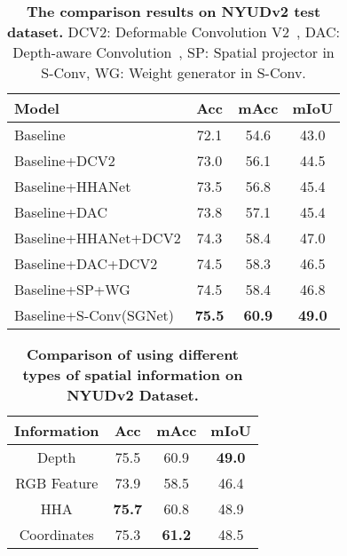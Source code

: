 \documentclass[journal]{IEEEtran}
\begin{document}
\begin{table}[htbp]\normalsize
	\centering
	\renewcommand\tabcolsep{8.0pt}
	\caption{\textbf{The comparison results on NYUDv2 test dataset.}
	    DCV2: Deformable
		Convolution V2~\cite{deformablev2},
		DAC: Depth-aware Convolution~\cite{dcnn}, 
		SP: Spatial projector in S-Conv, WG: Weight generator in S-Conv.
	}
	\label{tab:promote} \vspace{-7pt}
	\begin{tabular}{l ||c c c}
		\toprule[1.5pt]
		Model						&Acc & mAcc & mIoU	 \\
		\hline
		\hline
		Baseline 			       &72.1  &54.6 &43.0\\
		Baseline+DCV2              &73.0 &56.1&44.5\\
		Baseline+HHANet            &73.5  &56.8  &45.4 \\
		Baseline+DAC               &73.8  & 57.1 &45.4 \\
		Baseline+HHANet+DCV2 &74.3  &58.4  &47.0   \\
		Baseline+DAC+DCV2    &74.5  &58.3  &46.5   \\
		Baseline+SP+WG             &74.5  & 58.4 &46.8 \\
		Baseline+S-Conv(SGNet)     &\textbf{75.5}  &\textbf{60.9} &\textbf{49.0}\\
		\bottomrule[1.5pt]
	\end{tabular}
\end{table}



\begin{table}[t]\normalsize
	\centering
	\renewcommand\tabcolsep{14pt}
	\caption{\textbf{Comparison of using different types of spatial 
	information on NYUDv2 Dataset.}}
	\label{tab:ablation3} \vspace{-7pt}
	\begin{tabular}{c || c c c }
		\toprule[1.5pt]
		Information &  Acc 		& mAcc 	& mIoU \\
		\hline
		\hline
		Depth 		&75.5 &	60.9 &\textbf{49.0}    \\
		RGB Feature 	&73.9 &58.5 &46.4 \\
		HHA         &\textbf{75.7} &60.8& 48.9\\
		Coordinates 	&75.3&\textbf{61.2}&48.5  \\
		\bottomrule[1.5pt]
	\end{tabular}
\end{table}
\end{document}
